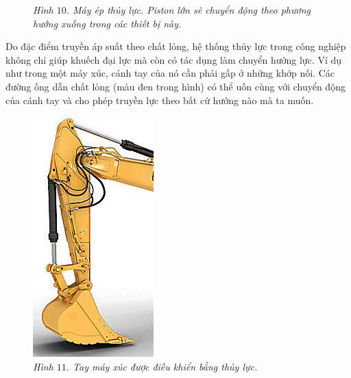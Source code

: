 \begin{multicols}{2}
\begin{figure}[H]
		\caption{\small\textit{\color{timhieukhoahoc}Hình $10$. Máy ép thủy lực. Piston lớn sẽ chuyển động theo phương hướng xuống trong các thiết bị này.}}
		\vspace*{-10pt}
	\end{figure}
	Do đặc điểm truyền áp suất theo chất lỏng, hệ thống thủy lực trong công nghiệp không chỉ giúp khuếch đại lực mà còn có tác dụng làm chuyển hướng lực. Ví dụ như trong một máy xúc, cánh tay của nó cần phải gấp ở những khớp nối. Các đường ống dẫn chất lỏng (màu đen trong hình) có thể uốn cùng với chuyển động của cánh tay và cho phép truyền lực theo bất cứ hướng nào mà ta muốn.
	\begin{figure}[H]
		\centering
		\captionsetup{labelformat= empty, justification=centering}
		\includegraphics[width= 0.45\linewidth]{22}
		\caption{\small\textit{\color{timhieukhoahoc}Hình $11$. Tay máy xúc được điều khiển bằng thủy lực.}}
		\vspace*{-10pt}
	\end{figure}
	\begin{figure}[H]
		\vspace*{-5pt}
		\centering
		\captionsetup{labelformat= empty, justification=centering}

\end{figure}
\end{multicols}
